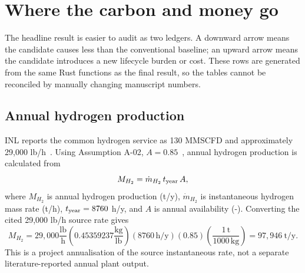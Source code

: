 \section{Where the carbon and money go}
\label{sec:ledgers}
The headline result is easier to audit as two ledgers. A downward arrow means the candidate causes less than the conventional baseline; an upward arrow means the candidate introduces a new lifecycle burden or cost. These rows are generated from the same Rust functions as the final result, so the tables cannot be reconciled by manually changing manuscript numbers.

\subsection{Annual hydrogen production}
INL reports the common hydrogen service as 130 MMSCFD and approximately 29,000 lb/h~\cite{inltev953,inltev961}. Using Assumption A-02, $A=0.85$~\cite{nishihara2007potential}, annual hydrogen production is calculated from
\begin{equation}\label{eq:annual-h2-general}
M_{H_2}=\dot m_{H_2}\,t_{\rm year}\,A,
\end{equation}
where $M_{H_2}$ is annual hydrogen production (t/y), $\dot m_{H_2}$ is instantaneous hydrogen mass rate (t/h), $t_{\rm year}=8760$ h/y, and $A$ is annual availability (-). Converting the cited 29,000 lb/h source rate gives
\begin{equation}\label{eq:annual-h2}
M_{H_2}=29{,}000\frac{\mathrm{lb}}{\mathrm h}
\left(0.45359237\frac{\mathrm{kg}}{\mathrm{lb}}\right)
(8760\,\mathrm{h/y})(0.85)
\left(\frac{1\,\mathrm t}{1000\,\mathrm{kg}}\right)
=97{,}946~\mathrm{t/y}.
\end{equation}
This is a project annualisation of the source instantaneous rate, not a separate literature-reported annual plant output.

